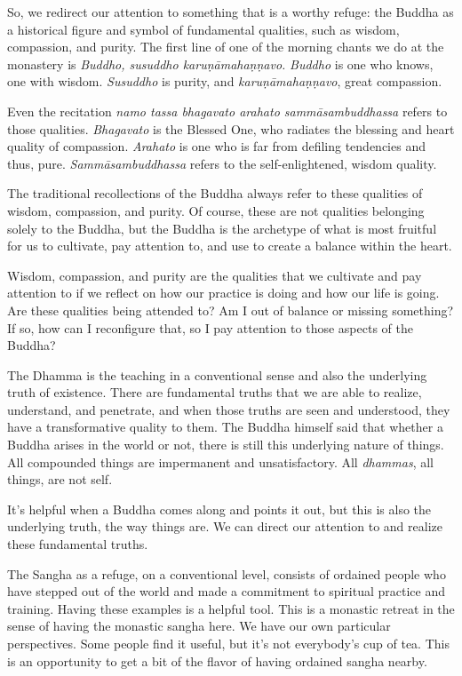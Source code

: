 So, we redirect our attention to something that is a worthy refuge: the
Buddha as a historical figure and symbol of fundamental qualities, such
as wisdom, compassion, and purity. The first line of one of the morning
chants we do at the monastery is \emph{Buddho, susuddho
karuṇāmahaṇṇavo.} \emph{Buddho} is one who knows, one with wisdom.
\emph{Susuddho} is purity, and \emph{karuṇāmahaṇṇavo}, great compassion.

Even the recitation \emph{namo tassa bhagavato arahato
sammāsambuddhassa} refers to those qualities. \emph{Bhagavato} is the
Blessed One, who radiates the blessing and heart quality of compassion.
\emph{Arahato} is one who is far from defiling tendencies and thus,
pure. \emph{Sammāsambuddhassa} refers to the self-enlightened, wisdom
quality.

The traditional recollections of the Buddha always refer to these
qualities of wisdom, compassion, and purity. Of course, these are not
qualities belonging solely to the Buddha, but the Buddha is the
archetype of what is most fruitful for us to cultivate, pay attention
to, and use to create a balance within the heart.

Wisdom, compassion, and purity are the qualities that we cultivate and
pay attention to if we reflect on how our practice is doing and how our
life is going. Are these qualities being attended to? Am I out of
balance or missing something? If so, how can I reconfigure that, so I
pay attention to those aspects of the Buddha?

The Dhamma is the teaching in a conventional sense and also the
underlying truth of existence. There are fundamental truths that we are
able to realize, understand, and penetrate, and when those truths are
seen and understood, they have a transformative quality to them. The
Buddha himself said that whether a Buddha arises in the world or not,
there is still this underlying nature of things. All compounded things
are impermanent and unsatisfactory. All \emph{dhammas}, all things, are
not self.

It’s helpful when a Buddha comes along and points it out, but this is
also the underlying truth, the way things are. We can direct our
attention to and realize these fundamental truths.

The Sangha as a refuge, on a conventional level, consists of ordained
people who have stepped out of the world and made a commitment to
spiritual practice and training. Having these examples is a helpful
tool. This is a monastic retreat in the sense of having the monastic
sangha here. We have our own particular perspectives. Some people find
it useful, but it’s not everybody’s cup of tea. This is an opportunity
to get a bit of the flavor of having ordained sangha nearby.

